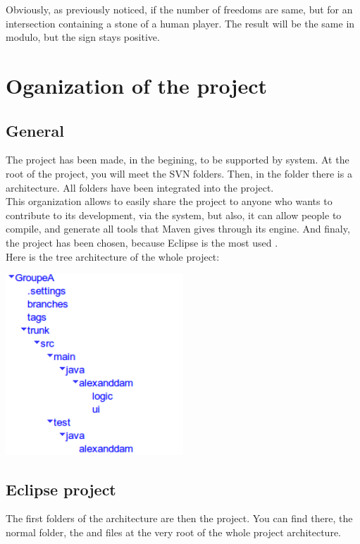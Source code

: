 \documentclass[a4paper,10pt]{report}
\newcommand{\empha}[1]{\textbf{\color{blue}{#1}}}
\begin{document}
Obviously, as previously noticed, if the number of freedoms are same, but for an intersection containing a stone of a human player. The result will be the same in modulo, but the sign stays positive.


		\section{Oganization of the project}

			\subsection{General}
				The project has been made, in the begining, to be supported by \empha{Subversion} system. At the root of the project, you will meet the SVN folders. Then, in the \empha{Trunk} folder there is a \empha{Maven} architecture. All folders have been integrated into the \empha{Eclipse} project.
\\
				This organization allows to easily share the project to anyone who wants to contribute to its development, via the \empha{SVN} system, but also, it can allow people to compile, and generate all tools that Maven gives through its engine. And finaly, the \empha{Eclipse} project has been chosen, because Eclipse is the most used \empha{Integrated Development Environment for Java}.
\\
				Here is the tree architecture of the whole project:
\\
				\begin{center}
					\includegraphics[width=0.50\textwidth] {img/tree.png}
				\end{center}


			\subsection{Eclipse project}
					The first folders of the architecture are then the \empha{Eclipse} project. You can find there, the normal \empha{.settings} folder, the  \empha{.classpath} and  \empha{.project} files at the very root of the whole project architecture.
\end{document}
